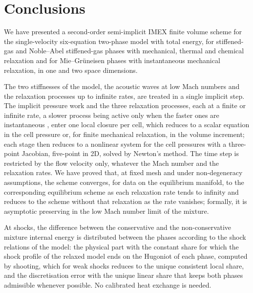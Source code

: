 \documentclass[a4paper,fleqn]{cas-sc}
\begin{document}
\section{Conclusions}
\label{sec:conclusions}

We have presented a second-order semi-implicit IMEX finite volume scheme for the single-velocity six-equation
two-phase model with total energy, for stiffened-gas and Noble--Abel stiffened-gas phases with mechanical, thermal and
chemical relaxation and for Mie--Gr\"uneisen phases with instantaneous mechanical relaxation, in one and two space dimensions.

The two stiffnesses of the model, the acoustic waves at low Mach numbers and the relaxation processes up to infinite
rates, are treated in a single implicit step. The implicit pressure work and the three relaxation processes, each at a
finite or infinite rate, a slower process being active only when the faster ones are instantaneous \cite{Pelanti2022}, enter one local closure per cell, which reduces to a scalar equation in the
cell pressure or, for finite mechanical relaxation, in the volume increment; each stage then reduces to a nonlinear system
for the cell pressures with a three-point Jacobian, five-point in 2D, solved by Newton's method. The time step is restricted by the flow velocity only, whatever
the Mach number and the relaxation rates. We have proved that, at fixed mesh and under non-degeneracy assumptions, the scheme converges, for data on the
equilibrium manifold, to the corresponding equilibrium scheme as each relaxation rate tends to infinity and reduces to the scheme without that
relaxation as the rate vanishes; formally, it is asymptotic preserving in the low Mach number limit of the mixture.

At shocks, the difference between the conservative and the non-conservative mixture internal energy is distributed
between the phases according to the shock relations of the model: the physical part with the constant share for which
the shock profile of the relaxed model ends on the Hugoniot of each phase, computed by shooting, which for weak shocks
reduces to the unique consistent local share, and the discretisation error with the unique linear share that keeps both phases
admissible whenever possible. No calibrated heat exchange is needed.
\end{document}
